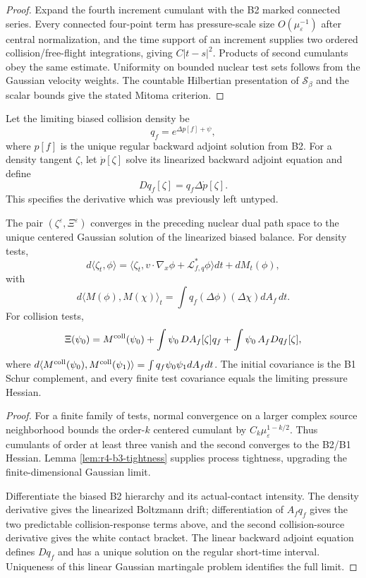 \begin{proof}
Expand the fourth increment cumulant with the B2 marked connected series.
Every connected four-point term has pressure-scale size
\(O(\mu_\varepsilon^{-1})\) after central normalization, and the time support
of an increment supplies two ordered collision/free-flight integrations,
giving \(C|t-s|^2\).  Products of second cumulants obey the same estimate.
Uniformity on bounded nuclear test sets follows from the Gaussian velocity
weights.  The countable Hilbertian presentation of \(\mathscr S_\beta\) and
the scalar bounds give the stated Mitoma criterion.
\end{proof}

Let the limiting biased collision density be
\[
 q_f=e^{\Delta p[f]+\psi},
\]
where \(p[f]\) is the unique regular backward adjoint solution from B2.  For a
density tangent \(\zeta\), let \(\dot p[\zeta]\) solve its linearized backward
adjoint equation and define
\[
 Dq_f[\zeta]=q_f\Delta\dot p[\zeta].
\]
This specifies the derivative which was previously left untyped.

\begin{theorem}
\label{thm:r3-b3-gaussian}
The pair \((\zeta^\varepsilon,\Xi^\varepsilon)\) converges in the preceding
nuclear dual path space to the unique centered Gaussian solution of the
linearized biased balance.  For density tests,
\[
 d\langle\zeta_t,\phi\rangle
 =\langle\zeta_t,
 v\cdot\nabla_x\phi+\mathcal L_{f,q}^*\phi\rangle dt
 +dM_t(\phi),
\]
with
\[
 d\langle M(\phi),M(\chi)\rangle_t
 =\int q_f(\Delta\phi)(\Delta\chi)dA_f\,dt.
\]
For collision tests,
\[
 \Xi(\psi_0)
 =M^{\rm coll}(\psi_0)
 +\int\psi_0\,D A_f[\zeta]q_f
 +\int\psi_0\,A_fDq_f[\zeta],
\]
where
\(d\langle M^{\rm coll}(\psi_0),M^{\rm coll}(\psi_1)\rangle
 =\int q_f\psi_0\psi_1dA_fdt\).
The initial covariance is the B1 Schur complement, and every finite test
covariance equals the limiting pressure Hessian.
\end{theorem}

\begin{proof}
For a finite family of tests, normal convergence on a larger complex source
neighborhood bounds the order-\(k\) centered cumulant by
\(C_k\mu_\varepsilon^{1-k/2}\).  Thus cumulants of order at least three
vanish and the second converges to the B2/B1 Hessian.  Lemma
\ref{lem:r4-b3-tightness} supplies process tightness, upgrading the
finite-dimensional Gaussian limit.

Differentiate the biased B2 hierarchy and its actual-contact intensity.  The
density derivative gives the linearized Boltzmann drift; differentiation of
\(A_fq_f\) gives the two predictable collision-response terms above, and the
second collision-source derivative gives the white contact bracket.  The
linear backward adjoint equation defines \(Dq_f\) and has a unique solution on
the regular short-time interval.  Uniqueness of this linear Gaussian martingale
problem identifies the full limit.
\end{proof}
